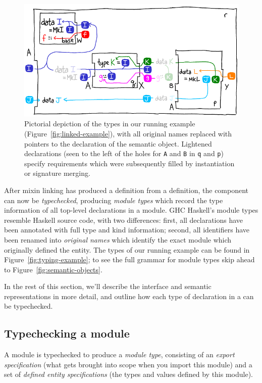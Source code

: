 \begin{figure}
\center\includegraphics{figures/pqr-type-diagram.pdf}
\caption{Pictorial depiction of the types in our running example
(Figure~\ref{fig:linked-example}), with all original names replaced with
pointers to the declaration of the semantic object.
Lightened declarations (seen to the left of the holes for \texttt{A} and
\texttt{B} in \texttt{q} and \texttt{p}) specify requirements which
were subsequently filled by instantiation or signature merging.}
\label{fig:typing-example-diagram}
\end{figure}

After mixin linking has produced a \unit{} definition from a \ccomp{}
definition, the component can now be \emph{typechecked}, producing \emph{module types}
which record the type information
of all top-level declarations in a module.
GHC Haskell's module types resemble Haskell source code,
with two differences:
first, all declarations have been annotated with full type and kind
information; second, all identifiers have been renamed into \emph{original
names} which identify the exact module which originally defined the
entity.  The types of our running example can be found
in Figure~\ref{fig:typing-example}; to see the full grammar for module
types skip ahead to Figure~\ref{fig:semantic-objects}.

In the rest of this section, we'll describe the interface and semantic
representations in more detail, and outline how each type of declaration
in a \unit{} can be typechecked.

\subsection{Typechecking a module}

A module is typechecked to produce a \emph{module
type}, consisting of an \emph{export
specification} (what gets brought into scope when
you import this module) and a set of \emph{defined entity specifications}
(the types and values defined by this module).

